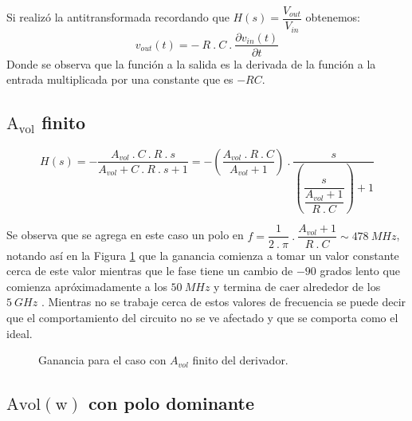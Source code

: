 \documentclass[11pt, a4paper]{article}
\begin{document}
Si realizó la antitransformada recordando que $H(s)= \dfrac{V_{out}}{V_{in}}$ obtenemos:
\begin{equation} 
v_{out} (t) = - \ R \ . \ C \ . \ \dfrac{\partial v_{in}(t)}{\partial t}
\end{equation}
Donde se observa que la función a la salida es la derivada de la función a la entrada multiplicada por una constante que es $- R C$.

\subsection{$\mathrm{A_{vol}}$ finito}
\begin{equation}
H(s) = - \dfrac{A_{vol} \ . \ C \ . \ R \ . \ s}{A_{vol} + C \ . \ R \ . \ s +1 } 
= -
\left( \dfrac{A_{vol} \ . \ R \ . \ C}{A_{vol} + 1} \right) \ . \ \dfrac{s}{ \left( \dfrac{s}{\dfrac {A_{vol} +1}{R \ . \ C}} \right) + 1}
\end{equation}

Se observa que se agrega en este caso un polo en $f = \dfrac{1}{2 \ . \ \pi} \ . \ \dfrac {A_{vol} +1}{R \ . \ C} \sim 478 \ MHz $, notando así en la Figura \ref{avolfinitoderivador} que la ganancia comienza a tomar un valor constante  cerca de este valor mientras que le fase tiene un cambio de $-90$ grados lento que comienza apróximadamente a los $50 \ MHz$ y termina de caer alrededor de los $5 \ GHz$
. Mientras no se trabaje cerca de estos valores de frecuencia se puede decir que el comportamiento del circuito no se ve afectado y que se comporta como el ideal. 

\begin{figure}[h!]
	\begin{center}
		\label{avolfinitoderivador}
		\caption{Ganancia para el caso con $A_{vol}$ finito del derivador.}
	\end{center}
\end{figure}

\subsection{$\mathrm{A{vol}(w)}$ con polo dominante}
\end{document}
